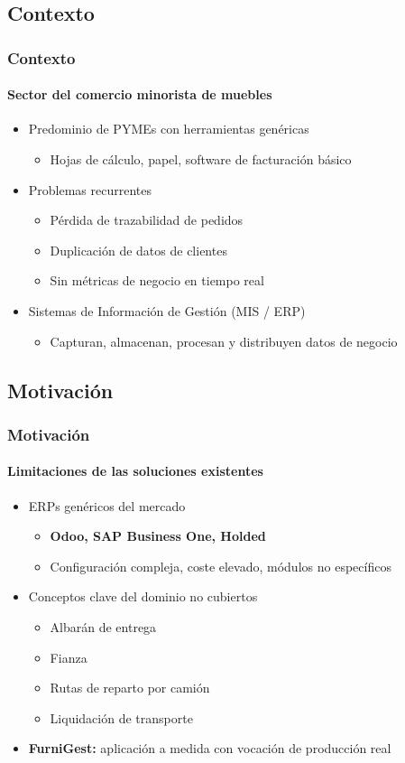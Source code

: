 \documentclass[xcolor=svgnames,aspectratio=169]{beamer}
\begin{document}
\subsection{Contexto}
\begin{frame}
  \frametitle{Contexto}
  \framesubtitle{Sector del comercio minorista de muebles}
  \begin{itemize}
    \item Predominio de PYMEs con herramientas gen\'ericas \smallskip
    \begin{itemize}
      \item Hojas de c\'alculo, papel, software de facturaci\'on b\'asico
    \end{itemize} \medskip
    \item Problemas recurrentes \smallskip
    \begin{itemize}
      \item P\'erdida de trazabilidad de pedidos \smallskip
      \item Duplicaci\'on de datos de clientes \smallskip
      \item Sin m\'etricas de negocio en tiempo real
    \end{itemize} \medskip
    \item Sistemas de Informaci\'on de Gesti\'on (MIS / ERP) \smallskip
    \begin{itemize}
      \item Capturan, almacenan, procesan y distribuyen datos de negocio
    \end{itemize}
  \end{itemize}
\end{frame}

\subsection{Motivaci\'on}
\begin{frame}
  \frametitle{Motivaci\'on}
  \framesubtitle{Limitaciones de las soluciones existentes}
  \begin{itemize}
    \item ERPs gen\'ericos del mercado \smallskip
    \begin{itemize}
      \item \textbf{Odoo, SAP Business One, Holded} \smallskip
      \item Configuraci\'on compleja, coste elevado, m\'odulos no espec\'ificos
    \end{itemize} \medskip
    \item Conceptos clave del dominio \alert{no cubiertos} \smallskip
    \begin{itemize}
      \item Albar\'an de entrega \smallskip
      \item Fianza \smallskip
      \item Rutas de reparto por cami\'on \smallskip
      \item Liquidaci\'on de transporte
    \end{itemize} \medskip
    \item \textbf{FurniGest:} aplicaci\'on a medida con vocaci\'on de \alert{producci\'on real}
  \end{itemize}
\end{frame}
\end{document}
